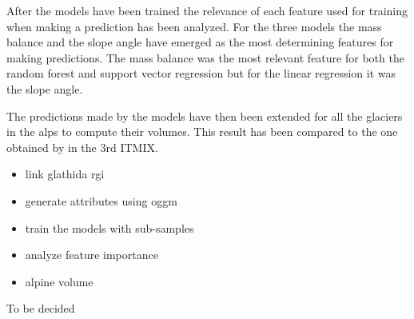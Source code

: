 After the models have been trained the relevance of each feature used for training when making a prediction has been analyzed. For the three models the mass balance and the slope angle have emerged as the most determining features for making predictions. The mass balance was the most relevant feature for both the random forest and support vector regression but for the linear regression it was the slope angle.

The predictions made by the models have then been extended for all the glaciers in the alps to compute their volumes. This result has been compared to the one obtained by \citet{Farinotti2019} in the 3rd ITMIX.

\begin{itemize}
	\item link glathida rgi
	\item generate attributes using oggm
	\item train the models with sub-samples
	\item analyze feature importance
	\item alpine volume
\end{itemize}


To be decided
